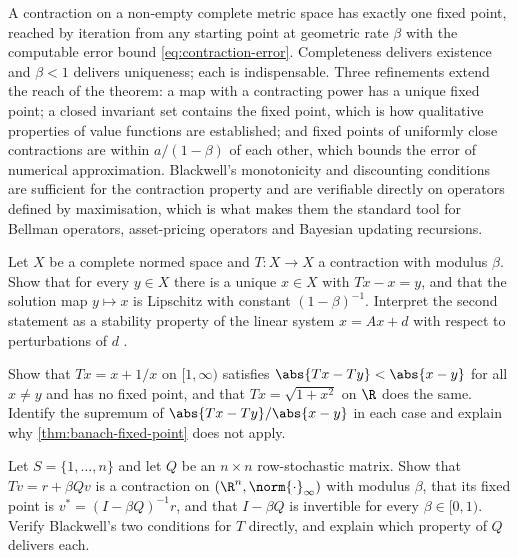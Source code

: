 A contraction on a non-empty complete metric space has exactly one fixed point,
reached by iteration from any starting point at geometric rate $\beta$ with the
computable error bound \eqref{eq:contraction-error}. Completeness delivers
existence and $\beta<1$ delivers uniqueness; each is indispensable. Three
refinements extend the reach of the theorem: a map with a contracting power has a
unique fixed point; a closed invariant set contains the fixed point, which is how
qualitative properties of value functions are established; and fixed points of
uniformly close contractions are within $a/(1-\beta)$ of each other, which bounds
the error of numerical approximation. Blackwell's monotonicity and discounting
conditions are sufficient for the contraction property and are verifiable
directly on operators defined by maximisation, which is what makes them the
standard tool for Bellman operators, asset-pricing operators and Bayesian
updating recursions.

\begin{exercise}\label{ex:comp-1}
	Let $X$ be a complete normed space and $T\colon X\to X$ a contraction with
	modulus $\beta$. Show that for every $y\in X$ there is a unique $x\in X$ with
	$Tx-x=y$, and that the solution map $y\mapsto x$ is Lipschitz with constant
	$(1-\beta)^{-1}$. Interpret the second statement as a stability property of the
	linear system $x=Ax+d$ with respect to perturbations of $d$
	\autocite[Ex.~8.31]{fukuda2026notes}.
\end{exercise}

\begin{exercise}\label{ex:comp-2}
	Show that $Tx=x+1/x$ on $[1,\infty)$ satisfies $\abs{Tx-Ty}<\abs{x-y}$ for all
	$x\neq y$ and has no fixed point, and that $Tx=\sqrt{1+x^2}$ on $\R$ does the
	same. Identify the supremum of $\abs{Tx-Ty}/\abs{x-y}$ in each case and explain
	why \autoref{thm:banach-fixed-point} does not apply.
\end{exercise}

\begin{exercise}\label{ex:comp-3}
	Let $S=\{1,\dots,n\}$ and let $Q$ be an $n\times n$ row-stochastic matrix. Show
	that $Tv=r+\beta Qv$ is a contraction on $(\R^n,\norm{\cdot}_\infty)$ with
	modulus $\beta$, that its fixed point is $v^\ast=(I-\beta Q)^{-1}r$, and that
	$I-\beta Q$ is invertible for every $\beta\in[0,1)$. Verify Blackwell's two
	conditions for $T$ directly, and explain which property of $Q$ delivers each.
\end{exercise}
